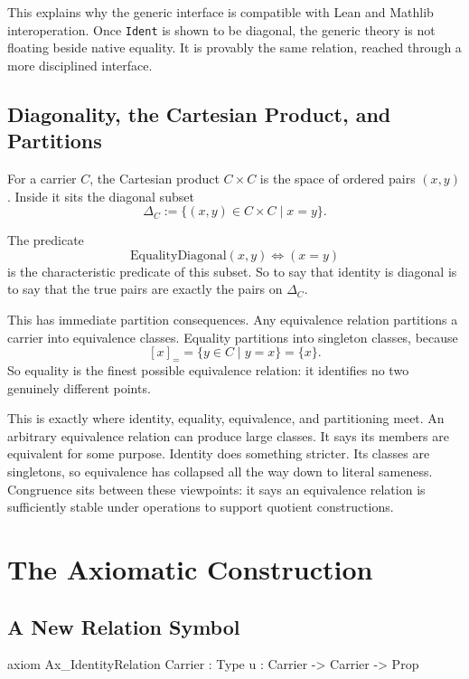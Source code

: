 \documentclass[11pt]{article}
\newcommand{\leaninline}[1]{\texttt{#1}}
\newcommand{\diag}[1]{\Delta_{#1}}
\begin{document}
This explains why the generic interface is compatible with Lean and Mathlib interoperation. Once \leaninline{Ident} is shown to be diagonal, the generic theory is not floating beside native equality. It is provably the same relation, reached through a more disciplined interface.

\subsection{Diagonality, the Cartesian Product, and Partitions}

For a carrier \(C\), the Cartesian product \(C \times C\) is the space of ordered pairs \((x,y)\). Inside it sits the diagonal subset
\[
\diag{C} := \{(x,y) \in C \times C \mid x = y\}.
\]

The predicate
\[
\mathrm{EqualityDiagonal}(x,y) \iff (x = y)
\]
is the characteristic predicate of this subset. So to say that identity is diagonal is to say that the true pairs are exactly the pairs on \(\diag{C}\).

This has immediate partition consequences. Any equivalence relation partitions a carrier into equivalence classes. Equality partitions into singleton classes, because
\[
[x]_= = \{y \in C \mid y = x\} = \{x\}.
\]
So equality is the finest possible equivalence relation: it identifies no two genuinely different points.

This is exactly where identity, equality, equivalence, and partitioning meet. An arbitrary equivalence relation can produce large classes. It says its members are equivalent for some purpose. Identity does something stricter. Its classes are singletons, so equivalence has collapsed all the way down to literal sameness. Congruence sits between these viewpoints: it says an equivalence relation is sufficiently stable under operations to support quotient constructions.

\section{The Axiomatic Construction}

\subsection{A New Relation Symbol}

\begin{leanblock}
axiom Ax_IdentityRelation {Carrier : Type u} : Carrier -> Carrier -> Prop
\end{leanblock}
\end{document}
